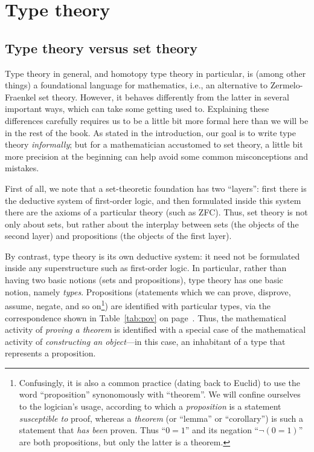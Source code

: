 \chapter{Type theory}
\label{cha:typetheory}

\section{Type theory versus set theory}
\label{sec:types-vs-sets}

Type theory in general, and homotopy type theory in particular, is (among other things) a foundational language for mathematics, i.e., an alternative to Zermelo-Fraenkel set theory.
However, it behaves differently from the latter in several important ways, which can take some getting used to.
Explaining these differences carefully requires us to be a little bit more formal here than we will be in the rest of the book.
As stated in the introduction, our goal is to write type theory \emph{informally}; but for a mathematician accustomed to set theory, a little bit more precision at the beginning can help avoid some common misconceptions and mistakes.

First of all, we note that a set-theoretic foundation has two ``layers'': first there is the deductive system of first-order logic, and then formulated inside this system there are the axioms of a particular theory (such as ZFC).
Thus, set theory is not only about sets, but rather about the interplay between sets (the objects of the second layer) and propositions (the objects of the first layer).

By contrast, type theory is its own deductive system: it need not be formulated inside any superstructure such as first-order logic.
In particular, rather than having two basic notions (sets and propositions), type theory has one basic notion, namely \emph{types}.
Propositions (statements which we can prove, disprove, assume, negate, and so on\footnote{Confusingly, it is also a common practice (dating back to Euclid) to use the word ``proposition'' synonomously with ``theorem''.
  We will confine ourselves to the logician's usage, according to which a \emph{proposition} is a statement \emph{susceptible to} proof, whereas a \emph{theorem} (or ``lemma'' or ``corollary'') is such a statement that \emph{has been} proven.
Thus ``$0=1$'' and its negation ``$\neg(0=1)$'' are both propositions, but only the latter is a theorem.}) are identified with particular types, via the correspondence shown in Table~\ref{tab:pov} on page~\pageref{tab:pov}.
Thus, the mathematical activity of \emph{proving a theorem} is identified with a special case of the mathematical activity of \emph{constructing an object}---in this case, an inhabitant of a type that represents a proposition.

